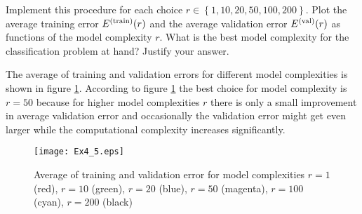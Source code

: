 \documentclass[article,11pt]{article}
\begin{document}
Implement this procedure for each choice $r \in \left\lbrace 1,10,20,50,100,200  \right\rbrace $.  
Plot the average training error $E^{(\rm train)}(r)$ and the average validation error $E^{(\rm val)}(r)$ 
as functions of the model complexity $r$. What is the best model complexity for the classification problem at hand? Justify your answer.

The average of training and validation errors for different model complexities is shown in figure \ref{fig:model_complexity}. According
to figure \ref{fig:model_complexity} the best choice for model complexity is
$r=50$ because for higher model complexities $r$ there is only a small
improvement in average validation error and occasionally the validation error
might get even larger while the computational complexity increases
significantly.
\begin{figure}[!h]
  \centering
  \texttt{[image: Ex4\_5.eps]}
  \caption{Average of training and validation error for model complexities
    $r=1$ (red), $r=10$ (green), $r=20$ (blue), $r=50$ (magenta), $r=100$ (cyan), $r=200$ (black)}
  \label{fig:model_complexity}
\end{figure}
\end{document}
